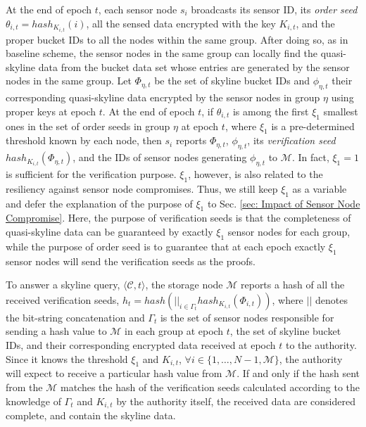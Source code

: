 \documentclass[conference]{IEEEtran}
\begin{document}
At the end of epoch $t$, each sensor node $s_i$ broadcasts its sensor ID, its \emph{order seed} $\theta_{i,t}=hash_{K_{i,t}}(i)$, all the sensed data encrypted with the key $K_{i,t}$, and the proper bucket IDs to all the nodes within the same group. After doing so, as in baseline scheme, the sensor nodes in the same group can locally find the quasi-skyline data from the bucket data set whose entries are generated by the sensor nodes in the same group. Let $\Phi_{\eta,t}$ be the set of skyline bucket IDs and $\phi_{\eta,t}$ their corresponding quasi-skyline data encrypted by the sensor nodes in group $\eta$ using proper keys at epoch $t$. At the end of epoch $t$, if $\theta_{i,t}$ is among the first $\xi_1$ smallest ones in the set of order seeds in group $\eta$ at epoch $t$, where $\xi_1$ is a pre-determined threshold known by each node, then $s_i$ reports $\Phi_{\eta,t}$, $\phi_{\eta,t}$, its \emph{verification seed} $hash_{K_{i,t}}(\Phi_{\eta,t})$, and the IDs of sensor nodes generating $\phi_{\eta,t}$ to $\mathcal{M}$. In fact, $\xi_1=1$ is sufficient for the verification purpose. $\xi_1$, however, is also related to the resiliency against sensor node compromises. Thus, we still keep $\xi_1$ as a variable and defer the explanation of the purpose of $\xi_1$ to Sec. \ref{sec: Impact of Sensor Node Compromise}. Here, the purpose of verification seeds is that the completeness of quasi-skyline data can be guaranteed by exactly $\xi_1$ sensor nodes for each group, while the purpose of order seed is to guarantee that at each epoch exactly $\xi_1$ sensor nodes will send the verification seeds as the proofs.

To answer a skyline query, $\langle \mathcal{C}, t\rangle$, the storage node $\mathcal{M}$ reports a hash of all the received verification seeds, $h_t=hash(||_{i\in\Gamma_t}hash_{K_{i,t}}(\Phi_{i,t}))$, where $||$ denotes the bit-string concatenation and $\Gamma_t$ is the set of sensor nodes responsible for sending a hash value to $\mathcal{M}$ in each group at epoch $t$, the set of skyline bucket IDs, and their corresponding encrypted data received at epoch $t$ to the authority. Since it knows the threshold $\xi_1$ and $K_{i,t}$, $\forall i\in\{1,\dots,N-1,\mathcal{M}\}$, the authority will expect to receive a particular hash value from $\mathcal{M}$. If and only if the hash sent from the $\mathcal{M}$ matches the hash of the verification seeds calculated according to the knowledge of $\Gamma_t$ and $K_{i,t}$ by the authority itself, the received data are considered complete, and contain the skyline data.
\end{document}
